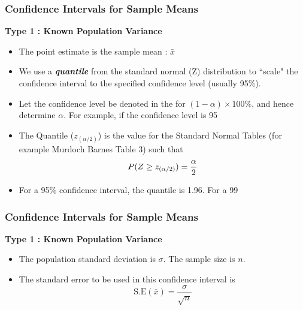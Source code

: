 \begin{frame}
\frametitle{Confidence Intervals for Sample Means}
\textbf{Type 1 : Known Population Variance}\\
\begin{itemize}

\item The point estimate is the sample mean : $\bar{x}$

\item We use a \textbf{\textit{quantile}} from the standard normal (Z) distribution to ``scale"
the confidence interval to the specified confidence level (usually 95\%).

\item Let the confidence level be denoted in the for $(1-\alpha)\times 100\%$, and hence determine $\alpha$.
For example, if the confidence level is 95%

\item The Quantile ($z_{(\alpha/2)}$) is the value for the Standard Normal Tables (for example Murdoch Barnes Table 3) such that
\[ P(Z \geq z_{(\alpha/2)}) = {\alpha \over 2}\]

\item For a 95\% confidence interval, the quantile is 1.96. For a 99%
\end{itemize}
\end{frame}
\begin{frame}
\frametitle{Confidence Intervals for Sample Means}
\textbf{Type 1 : Known Population Variance}\\
\begin{itemize}

\item The population standard deviation is $\sigma$. The sample size is $n$.
\item The standard error to be used in this confidence interval is
\[ \mbox{S.E}(\bar{x}) = \frac{\sigma}{\sqrt{n}}\]

\end{itemize}
\end{frame}

